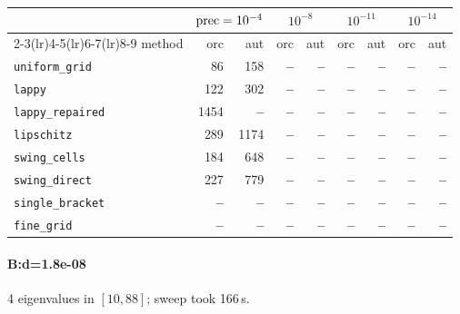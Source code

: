 \begin{center}
\small
\begin{tabular}{lrrrrrrrr}
\toprule
& \multicolumn{2}{c}{$\mathrm{prec}=10^{-4}$} & \multicolumn{2}{c}{$10^{-8}$} & \multicolumn{2}{c}{$10^{-11}$} & \multicolumn{2}{c}{$10^{-14}$} \\
\cmidrule(lr){2-3}\cmidrule(lr){4-5}\cmidrule(lr){6-7}\cmidrule(lr){8-9}
method & orc & aut & orc & aut & orc & aut & orc & aut \\
\midrule
\texttt{uniform\_grid} & 86 & 158 & \textbf{--} & \textbf{--} & \textbf{--} & \textbf{--} & \textbf{--} & \textbf{--} \\
\texttt{lappy} & 122 & 302 & \textbf{--} & \textbf{--} & \textbf{--} & \textbf{--} & \textbf{--} & \textbf{--} \\
\texttt{lappy\_repaired} & 1454 & \textbf{--} & \textbf{--} & \textbf{--} & \textbf{--} & \textbf{--} & \textbf{--} & \textbf{--} \\
\texttt{lipschitz} & 289 & 1174 & \textbf{--} & \textbf{--} & \textbf{--} & \textbf{--} & \textbf{--} & \textbf{--} \\
\texttt{swing\_cells} & 184 & 648 & \textbf{--} & \textbf{--} & \textbf{--} & \textbf{--} & \textbf{--} & \textbf{--} \\
\texttt{swing\_direct} & 227 & 779 & \textbf{--} & \textbf{--} & \textbf{--} & \textbf{--} & \textbf{--} & \textbf{--} \\
\midrule
\texttt{single\_bracket} & \textbf{--} & \textbf{--} & \textbf{--} & \textbf{--} & \textbf{--} & \textbf{--} & \textbf{--} & \textbf{--} \\
\texttt{fine\_grid} & \textbf{--} & \textbf{--} & \textbf{--} & \textbf{--} & \textbf{--} & \textbf{--} & \textbf{--} & \textbf{--} \\
\bottomrule
\end{tabular}
\end{center}

\paragraph{B:d=1.8e-08} 4 eigenvalues in $[10, 88]$; sweep took 166\,s.

